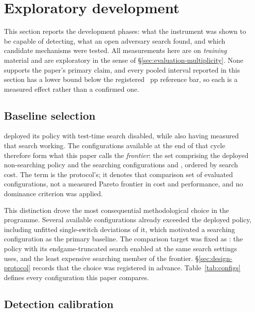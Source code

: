 \section{Exploratory development}
\label{sec:development}

This section reports the development phases: what the instrument was shown to be capable of
detecting, what an open adversary search found, and which candidate mechanisms were tested. All
measurements here are on \emph{training} material and are exploratory in the sense of
\S\ref{sec:evaluation-multiplicity}. None supports the paper's primary claim, and every pooled
interval reported in this section has a lower bound below the registered
\vsevenPrimaryFloor{}~pp reference bar, so each is a measured effect rather than a confirmed one.

\subsection{Baseline selection}
\label{sec:development-frontier}

\vsix{} deployed its policy with test-time search disabled, while also having measured that search
working. The configurations available at the end of that cycle therefore form what this paper
calls the \emph{\vsix{} frontier}: the set comprising the deployed non-searching policy and the
searching configurations \fcheap{} and \fmid{}, ordered by search cost. The term is the protocol's; it
denotes that comparison set of evaluated configurations, not a measured Pareto frontier in cost
and performance, and no dominance criterion was applied.

This distinction drove the most consequential methodological choice in the programme. Several
available configurations already exceeded the deployed policy, including unfitted single-switch
deviations of it, which motivated a searching configuration as the primary baseline. The
comparison target was fixed as \fcheap{}: the \vsix{} policy with its endgame-truncated search
enabled at the same search settings \sestina{} uses, and the least expensive searching member of
the frontier. \S\ref{sec:design-protocol} records that the choice was registered in advance.
Table~\ref{tab:configs} defines every configuration this paper compares.

\subsection{Detection calibration}
\label{sec:development-instrument}

